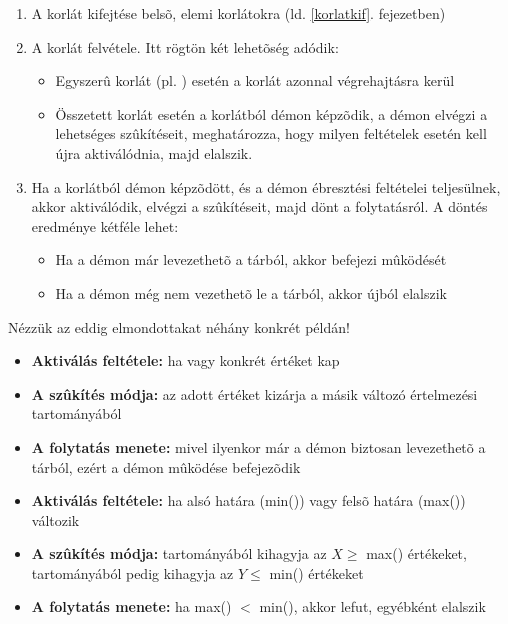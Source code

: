 \begin{enumerate}
\item A korlát kifejtése belsõ, elemi korlátokra (ld. \ref{korlatkif}. fejezetben)
\item A korlát felvétele. Itt rögtön két lehetõség adódik:

	\begin{itemize}
	\item Egyszerû korlát (pl. ) esetén a korlát azonnal végrehajtásra kerül
	\item Összetett korlát esetén a korlátból démon képzõdik, a démon elvégzi a
	lehetséges szûkítéseit, meghatározza, hogy milyen feltételek esetén kell újra
	aktiválódnia, majd elalszik.
	\end{itemize}

\item Ha a korlátból démon képzõdött, és a démon ébresztési feltételei teljesülnek, akkor
aktiválódik, elvégzi a szûkítéseit, majd dönt a folytatásról. A döntés eredménye kétféle
lehet:

	\begin{itemize}
	\item Ha a démon már levezethetõ a tárból, akkor befejezi mûködését
	\item Ha a démon még nem vezethetõ le a tárból, akkor újból elalszik
	\end{itemize}

\end{enumerate}

Nézzük az eddig elmondottakat néhány konkrét példán!

\begin{itemize}
\item {\bf Aktiválás feltétele:} ha  vagy  konkrét értéket kap
\item {\bf A szûkítés módja:} az adott értéket kizárja a másik változó értelmezési
tartományából
\item {\bf A folytatás menete:} mivel ilyenkor már a démon biztosan levezethetõ
a tárból, ezért a démon mûködése befejezõdik
\end{itemize}

\begin{itemize}
\item {\bf Aktiválás feltétele:} ha  alsó határa (min()) vagy 
felsõ határa (max()) változik
\item {\bf A szûkítés módja:}  tartományából kihagyja az $X \ge$ max()
értékeket,  tartományából pedig kihagyja az $Y \le$ min() értékeket
\item {\bf A folytatás menete:} ha max() $<$ min(), akkor lefut,
egyébként elalszik
\end{itemize}

